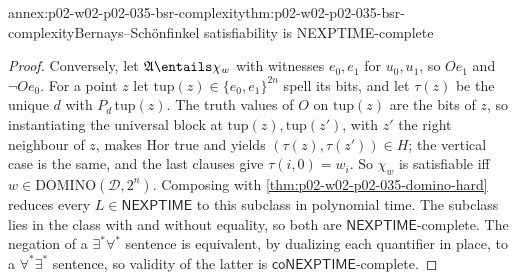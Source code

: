 \begin{annexitem}{annex:p02-w02-p02-035-bsr-complexity}{thm:p02-w02-p02-035-bsr-complexity}{Bernays--Sch\"onfinkel satisfiability is NEXPTIME-complete}
\begin{proof}
Conversely, let \(\mathfrak A\entails\chi_w\) with witnesses \(e_0,e_1\) for
\(u_0,u_1\), so \(Oe_1\) and \(\neg Oe_0\).  For a point \(z\) let
\(\mathrm{tup}(z)\in\{e_0,e_1\}^{2n}\) spell its bits, and let \(\tau(z)\) be the
unique \(d\) with \(P_d\,\mathrm{tup}(z)\).  The truth values of \(O\) on
\(\mathrm{tup}(z)\) are the bits of \(z\), so instantiating the universal block
at \(\mathrm{tup}(z),\mathrm{tup}(z')\), with \(z'\) the right neighbour of
\(z\), makes \(\mathrm{Hor}\) true and yields \((\tau(z),\tau(z'))\in H\); the
vertical case is the same, and the last clauses give \(\tau(i,0)=w_i\).  So
\(\chi_w\) is satisfiable iff \(w\in\mathrm{DOMINO}(\mathcal D,2^n)\).
Composing with \cref{thm:p02-w02-p02-035-domino-hard} reduces every
\(L\in\mathsf{NEXPTIME}\) to this subclass in polynomial time.  The subclass
lies in the class with and without equality, so both are
\(\mathsf{NEXPTIME}\)-complete.  The negation of a \(\exists^{*}\forall^{*}\)
sentence is equivalent, by dualizing each quantifier in place, to a
\(\forall^{*}\exists^{*}\) sentence, so validity of the latter is
\(\mathsf{coNEXPTIME}\)-complete.
\end{proof}
\end{annexitem}

